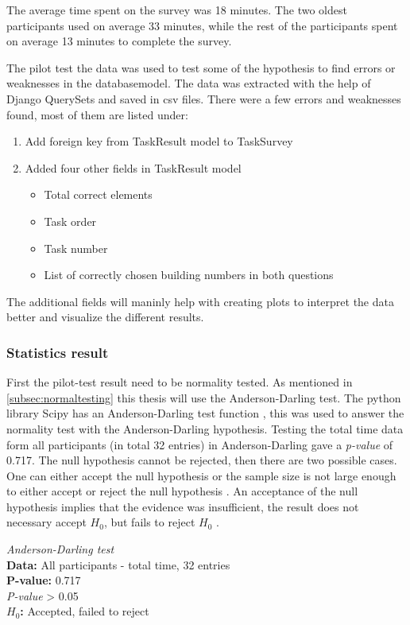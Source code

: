 The average time spent on the survey was 18 minutes. The two oldest participants used on average 33 minutes, while the rest of the participants spent on average 13 minutes to complete the survey. 

The pilot test the data was used to test some of the hypothesis to find errors or weaknesses in the databasemodel. The data was extracted with the help of Django QuerySets and saved in csv files. There were a few errors and weaknesses found, most of them are listed under: 

\begin{enumerate}
	\item Add foreign key from TaskResult model to TaskSurvey
	\item Added four other fields in TaskResult model
	\begin{itemize}
		\item Total correct elements 
		\item Task order
		\item Task number
		\item List of correctly chosen building numbers in both questions
	\end{itemize}
\end{enumerate}

The additional fields will maninly help with creating plots to interpret the data better and visualize the different results. 

\subsubsection{Statistics result}
First the pilot-test result need to be normality tested. 
As mentioned in \ref{subsec:normaltesting} this thesis will use the Anderson-Darling test. The python library Scipy has an Anderson-Darling test function \citep{TheScipycommunity2017}, this was used to answer the normality test with the Anderson-Darling hypothesis. Testing the total time data form all participants (in total 32 entries) in Anderson-Darling gave a \textit{p-value} of 0.717. The null hypothesis cannot be rejected, then there are two possible cases. One can either accept the null hypothesis or the sample size is not large enough to either accept or reject the null hypothesis \citep{ThePennsylvaniaStateUniversity2017}. An acceptance of the null hypothesis implies that the evidence was insufficient, the result does not necessary accept $H_{0}$, but fails to reject $H_{0}$ \citep{Walpole2012}.  

\begin{framed}{\noindent\centering
\textit{Anderson-Darling test} \\
\textbf{Data:} All participants - total time, 32 entries\\
  \textbf{P-value:} 0.717  \\
    \textit{P-value} > 0.05\\
  \textbf{$H_{0}$:} Accepted, failed to reject
  \par}
\end{framed}


